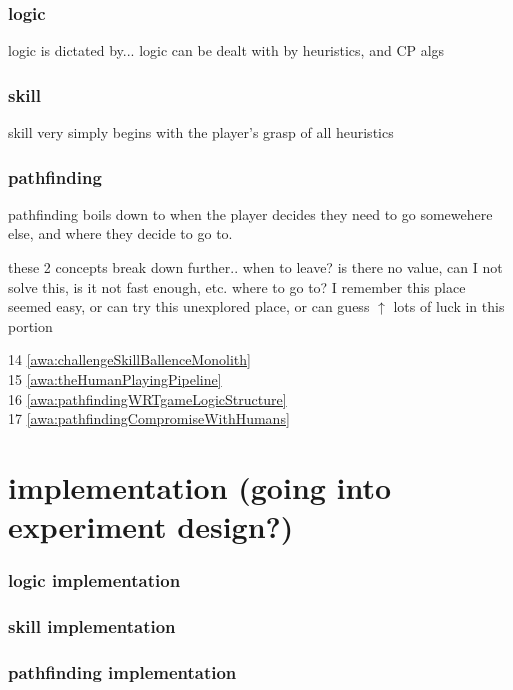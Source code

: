         \subsubsection{logic}
            logic is dictated by...
            logic can be dealt with by heuristics, and CP algs

        \subsubsection{skill}
            skill very simply begins with the player's grasp of all heuristics

        \subsubsection{pathfinding}
            pathfinding boils down to when the player decides they need to go somewehere else,
            and where they decide to go to.

            these 2 concepts break down further..
                when to leave? is there no value, can I not solve this, is it not fast enough, etc.
                where to go to? I remember this place seemed easy, or can try this unexplored place, or can guess
                    $\uparrow$ lots of luck in this portion

            14 \ref{awa:challengeSkillBallenceMonolith}  \\
            15 \ref{awa:theHumanPlayingPipeline}  \\
            16 \ref{awa:pathfindingWRTgameLogicStructure}  \\
            17 \ref{awa:pathfindingCompromiseWithHumans}  \\

\section{implementation (going into experiment design?)}
    \subsubsection{logic implementation}
    \subsubsection{skill implementation}
    \subsubsection{pathfinding implementation}

\vfill
\setcounter{page}{0}
